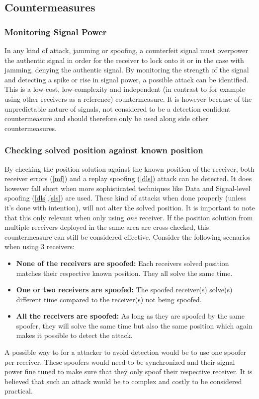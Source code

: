 \documentclass[12pt,english,a4paper]{article}
\begin{document}
\subsection{Countermeasures}
\subsubsection{Monitoring Signal Power} %
In any kind of attack, jamming or spoofing, a counterfeit signal must overpower the authentic signal in order for the receiver to lock onto it or in the case with jamming, denying the authentic signal. By monitoring the strength of the signal and detecting a spike or rise in signal power, a possible attack can be identified. This is a low-cost, low-complexity and independent (in contrast to for example using other receivers as a reference) countermeasure. It is however because of the unpredictable nature of signals, not considered to be a detection confident countermeasure and should therefore only be used along side other countermeasures.\cite{HengChouGao14}

\subsubsection{Checking solved position against known position} %
By checking the position solution against the known position of the receiver, both receiver errors (\ref{mf}) and a replay spoofing (\ref{dls}) attack can be detected. It does however fall short when more sophisticated techniques like Data and Signal-level spoofing (\ref{dls},\ref{sls}) are used. These kind of attacks when done properly (unless it's done with intention), will not alter the solved position. It is important to note that this only relevant when only using \textit{one} receiver. If the position solution from multiple receivers deployed in the same area are cross-checked, this countermeasure can still be considered effective. Consider the following scenarios when using 3 receivers:
\begin{itemize}
  \item \textbf{None of the receivers are spoofed:} Each receivers solved position matches their respective known position. They all solve the same time. 
  \item \textbf{One or two receivers are spoofed:} The spoofed receiver(s) solve(s) different time compared to the receiver(s) not being spoofed.
  \item \textbf{All the receivers are spoofed:} As long as they are spoofed by the same spoofer, they will solve the same time but also the same position which again makes it possible to detect the attack.
\end{itemize}
A possible way to for a attacker to avoid detection would be to use one spoofer per receiver. These spoofers would need to be synchronized and their signal power fine tuned to make sure that they only spoof their respective receiver. It is believed that such an attack would be to complex and costly to be considered practical. \cite{HengChouGao14}
\end{document}
